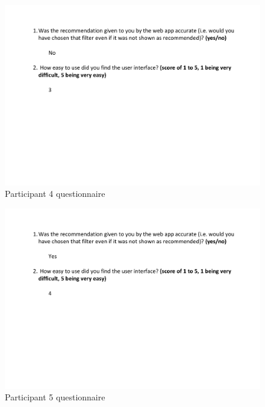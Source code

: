 \documentclass[a4paper,12pt]{report}
\begin{document}
\begin{appendices}
    \begin{figure}[h]
      \centering
      \includegraphics[width=0.9\linewidth]{questionnaire-4}
      \caption{Participant 4 questionnaire}
    \end{figure}

    \begin{figure}[h]
      \centering
      \includegraphics[width=0.9\linewidth]{questionnaire-5}
      \caption{Participant 5 questionnaire}
    \end{figure}

\end{appendices}
\end{document}
